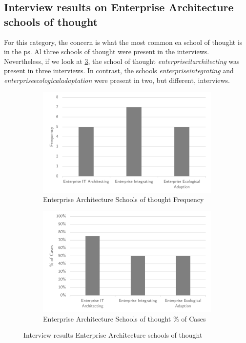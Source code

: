 \subsection{Interview results on Enterprise Architecture schools of thought}
\label{sub:interviewresultseaschools}
For this category, the concern is what the most common \acrlong{ea} school of thought is in the \gls{ps}. Al three schools of thought were present in the interviews. Nevertheless, if we look at \cref{fig:intervieweaschoolsantifragile}, the school of thought \textit{\gls{enterpriseitarchitecting}} was present in three interviews. In contrast, the schools \textit{\gls{enterpriseintegrating}} and \textit{\gls{enterpriseecologicaladaptation}} were present in two, but different, interviews.
\begin{figure}[H]
	\centering
	\begin{subfigure}[H]{0.5\textwidth}
		\centering
		\includegraphics[width=0.95\linewidth]{images/easchools_frequency}
		\caption{Enterprise Architecture Schools of thought Frequency}
		\label{fig:easchoolsfrequency}
	\end{subfigure}%
	\begin{subfigure}[H]{0.5\textwidth}
		\centering
		\includegraphics[width=0.95\linewidth]{images/easchools_cases}
		\caption{Enterprise Architecture Schools of thought \% of Cases}
		\label{fig:easchoolscases}
	\end{subfigure}
	\caption{Interview results Enterprise Architecture schools of thought}
	\label{fig:intervieweaschoolsantifragile}
\end{figure}
